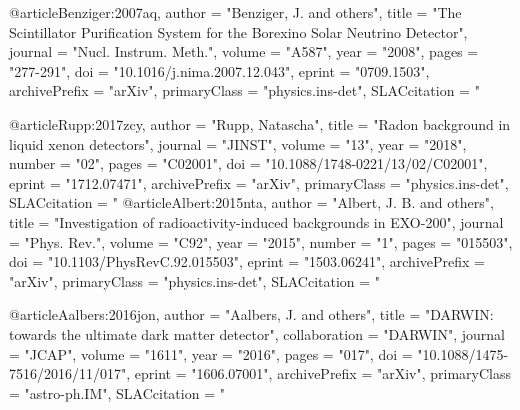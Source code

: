 {{{@article{Benziger:2007aq,
      author         = "Benziger, J. and others",
      title          = "{The Scintillator Purification System for the Borexino
                        Solar Neutrino Detector}",
      journal        = "Nucl. Instrum. Meth.",
      volume         = "A587",
      year           = "2008",
      pages          = "277-291",
      doi            = "10.1016/j.nima.2007.12.043",
      eprint         = "0709.1503",
      archivePrefix  = "arXiv",
      primaryClass   = "physics.ins-det",
      SLACcitation   = "%
}

@article{Rupp:2017zcy,
      author         = "Rupp, Natascha",
      title          = "{Radon background in liquid xenon detectors}",
      journal        = "JINST",
      volume         = "13",
      year           = "2018",
      number         = "02",
      pages          = "C02001",
      doi            = "10.1088/1748-0221/13/02/C02001",
      eprint         = "1712.07471",
      archivePrefix  = "arXiv",
      primaryClass   = "physics.ins-det",
      SLACcitation   = "%
}
@article{Albert:2015nta,
      author         = "Albert, J. B. and others",
      title          = "{Investigation of radioactivity-induced backgrounds in
                        EXO-200}",
      journal        = "Phys. Rev.",
      volume         = "C92",
      year           = "2015",
      number         = "1",
      pages          = "015503",
      doi            = "10.1103/PhysRevC.92.015503",
      eprint         = "1503.06241",
      archivePrefix  = "arXiv",
      primaryClass   = "physics.ins-det",
      SLACcitation   = "%
}

@article{Aalbers:2016jon,
      author         = "Aalbers, J. and others",
      title          = "{DARWIN: towards the ultimate dark matter detector}",
      collaboration  = "DARWIN",
      journal        = "JCAP",
      volume         = "1611",
      year           = "2016",
      pages          = "017",
      doi            = "10.1088/1475-7516/2016/11/017",
      eprint         = "1606.07001",
      archivePrefix  = "arXiv",
      primaryClass   = "astro-ph.IM",
      SLACcitation   = "%
}

}}}
